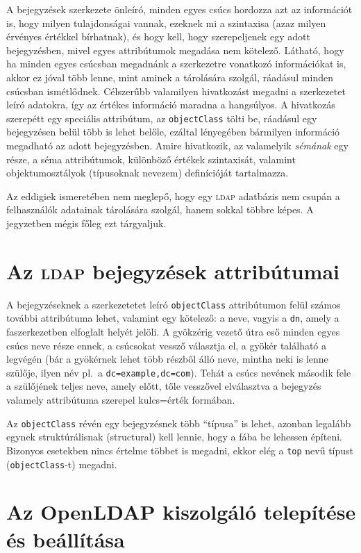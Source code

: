 A bejegyzések szerkezete önleíró, minden egyes csúcs hordozza azt az információt is, hogy milyen tulajdonságai vannak,
ezeknek mi a szintaxisa (azaz milyen érvényes értékkel bírhatnak), és hogy kell, hogy szerepeljenek egy adott
bejegyzésben, mivel egyes attribútumok megadása nem kötelező. Látható, hogy ha  minden egyes csúcsban megadnánk a
szerkezetre vonatkozó információkat is, akkor ez jóval több lenne, mint aminek a tárolására szolgál, ráadásul minden
csúcsban ismétlődnek. Célszerűbb valamilyen hivatkozást megadni a szerkezetet leíró adatokra, így az értékes információ
maradna a hangsúlyos. A hivatkozás szerepétt egy speciális attribútum, az \texttt{objectClass} tölti be, ráadásul egy
bejegyzésen belül több is lehet belőle, ezáltal lényegében bármilyen információ megadható az adott
bejegyzésben. Amire hivatkozik, az valamelyik \emph{sémának} egy része, a séma attribútumok, különböző értékek
szintaxisát, valamint objektumosztályok (típusoknak nevezem) definícióját tartalmazza.

Az eddigiek ismeretében nem meglepő, hogy egy \textsc{ldap} adatbázis nem csupán a felhasználók adatainak tárolására
szolgál, hanem sokkal többre képes. A jegyzetben mégis főleg ezt tárgyaljuk.


\section{Az \textsc{ldap} bejegyzések attribútumai}

A bejegyzéseknek a szerkezetetet leíró \texttt{objectClass} attribútumon felül számos további attribútuma lehet,
valamint egy kötelező: a neve, vagyis a \texttt{dn}, amely a faszerkezetben elfoglalt helyét jelöli. A gyökzérig vezető
útra eső minden egyes csúcs neve része ennek, a csúcsokat vessző választja el, a gyökér található a legvégén (bár a
gyökérnek lehet több részből álló neve, mintha neki is lenne szülője, ilyen név pl.\ a
\texttt{dc=example,dc=com}). Tehát a csúcs nevének második fele a szülőjének teljes neve, amely előtt, tőle vesszővel
elválasztva a bejegyzés valamely attribútuma szerepel kulcs=érték formában.

Az \texttt{objectClass} révén egy bejegyzésnek több ``típusa'' is lehet, azonban legalább egynek struktúrálisnak
(structural) kell lennie, hogy a fába be lehessen építeni. Bizonyos esetekben nincs értelme többet is megadni, ekkor
elég a \texttt{top} nevű típust (\texttt{objectClass}-t) megadni.



\section{Az OpenLDAP kiszolgáló telepítése és beállítása}


